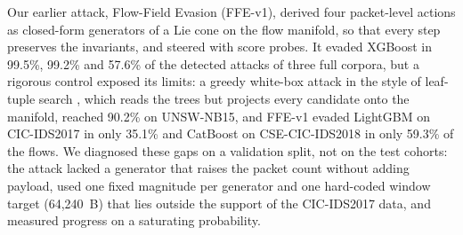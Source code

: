 Our earlier attack, Flow-Field Evasion (FFE-v1), derived four packet-level actions as closed-form generators of a Lie cone on the flow manifold, so that every step preserves the invariants, and steered with score probes. It evaded XGBoost in 99.5\%, 99.2\% and 57.6\% of the detected attacks of three full corpora, but a rigorous control exposed its limits: a greedy white-box attack in the style of leaf-tuple search \cite{zhang2020efficient}, which reads the trees but projects every candidate onto the manifold, reached 90.2\% on UNSW-NB15, and FFE-v1 evaded LightGBM on CIC-IDS2017 in only 35.1\% and CatBoost on CSE-CIC-IDS2018 in only 59.3\% of the flows. We diagnosed these gaps on a validation split, not on the test cohorts: the attack lacked a generator that raises the packet count without adding payload, used one fixed magnitude per generator and one hard-coded window target (64,240~B) that lies outside the support of the CIC-IDS2017 data, and measured progress on a saturating probability.

